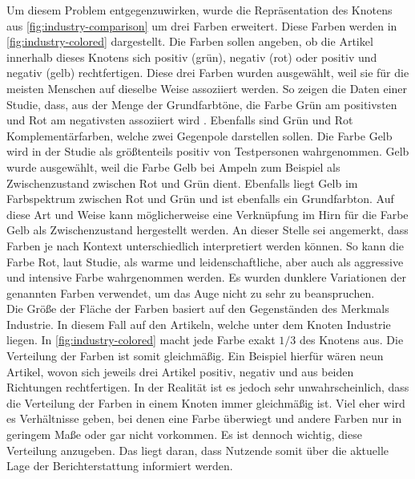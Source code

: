 Um diesem Problem entgegenzuwirken, wurde die Repräsentation des Knotens aus \autoref{fig:industry-comparison} um drei Farben erweitert.
Diese Farben werden in \autoref{fig:industry-colored} dargestellt.
Die Farben sollen angeben, ob die Artikel innerhalb dieses Knotens sich positiv (grün), negativ (rot) oder positiv und negativ (gelb) rechtfertigen.
Diese drei Farben wurden ausgewählt, weil sie für die meisten Menschen auf dieselbe Weise assoziiert werden.
So zeigen die Daten einer Studie, dass, aus der Menge der Grundfarbtöne, die Farbe Grün am positivsten und Rot am negativsten assoziiert wird \cite{color-emotion}.
Ebenfalls sind Grün und Rot Komplementärfarben, welche zwei Gegenpole darstellen sollen.
Die Farbe Gelb wird in der Studie als größtenteils positiv von Testpersonen wahrgenommen.
Gelb wurde ausgewählt, weil die Farbe Gelb bei Ampeln zum Beispiel als Zwischenzustand zwischen Rot und Grün dient.
Ebenfalls liegt Gelb im Farbspektrum zwischen Rot und Grün und ist ebenfalls ein Grundfarbton.
Auf diese Art und Weise kann möglicherweise eine Verknüpfung im Hirn für die Farbe Gelb als Zwischenzustand hergestellt werden.
An dieser Stelle sei angemerkt, dass Farben je nach Kontext unterschiedlich interpretiert werden können.
So kann die Farbe Rot, laut Studie, als warme und leidenschaftliche, aber auch als aggressive und intensive Farbe wahrgenommen werden.
Es wurden dunklere Variationen der genannten Farben verwendet, um das Auge nicht zu sehr zu beanspruchen.\\

Die Größe der Fläche der Farben basiert auf den Gegenständen des Merkmals Industrie.
In diesem Fall auf den Artikeln, welche unter dem Knoten Industrie liegen.
In \autoref{fig:industry-colored} macht jede Farbe exakt $1/3$ des Knotens aus.
Die Verteilung der Farben ist somit gleichmäßig.
Ein Beispiel hierfür wären neun Artikel, wovon sich jeweils drei Artikel positiv, negativ und aus beiden Richtungen rechtfertigen.
In der Realität ist es jedoch sehr unwahrscheinlich, dass die Verteilung der Farben in einem Knoten immer gleichmäßig ist.
Viel eher wird es Verhältnisse geben, bei denen eine Farbe überwiegt und andere Farben nur in geringem Maße oder gar nicht vorkommen.
Es ist dennoch wichtig, diese Verteilung anzugeben.
Das liegt daran, dass Nutzende somit über die aktuelle Lage der Berichterstattung informiert werden. \\

